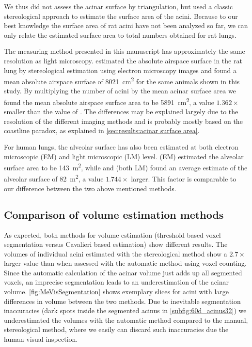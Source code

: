 \documentclass[paper=a4,DIV=calc,abstract,english]{scrartcl}
\newcommand{\difference}{2.7\xspace} %
\newcommand{\meanairspacesurface}{5891} %
\newcommand{\airspacedifference}{1.362\xspace} %
\begin{document}
We thus did not assess the acinar surface by triangulation, but used a classic stereological approach to estimate the surface area of the acini.
Because to our best knowledge the surface area of rat acini have not been analyzed so far, we can only relate the estimated surface area to total numbers obtained for rat lungs.

The measuring method presented in this manuscript has approximately the same resolution as light microscopy.
\citet{Tschanz2003} estimated the absolute airspace surface in the rat lung by stereological estimation using electron microscopy images and found a mean absolute airspace surface of \SI{8021}{\centi\meter\squared} for the same animals shown in this study.
By multiplying the number of acini by the mean acinar surface area we found the mean absolute airspace surface area to be \SI{\meanairspacesurface}{\centi\meter\squared}, a value \(\airspacedifference\times\) smaller than the value of \citeauthor{Tschanz2003}.
The differences may be explained largely due to the resolution of the different imaging methods and is probably mostly based on the coastline paradox, as explained in \autoref{sec:results:acinar surface area}.

For human lungs, the alveolar surface has also been estimated at both electron microscopic (EM) and light microscopic (LM) level.
\citet{Gehr1978} (EM) estimated the alveolar surface area to be \SI{143}{\square\meter}, while \citet{Weibel1963} and \citet{Thurlbeck1967} (both LM) found an average estimate of the alveolar surface of \SI{82}{\square\meter}, a value \(1.744\times\) larger.
This factor is comparable to our difference between the two above mentioned methods.

\subsection{Comparison of volume estimation methods}
As expected, both methods for volume estimation (threshold based voxel segmentation versus Cavalieri based estimation) show different results.
The volumes of individual acini estimated with the stereological method show a \(\difference\times\) larger value than when assessed with the automatic method using voxel counting.
Since the automatic calculation of the acinar volume just adds up all segmented voxels, an imprecise segmentation leads to an underestimation of the acinar volume.
\autoref{fig:MeVisSegmentation} shows exemplary slices for acini with large differences in volume between the two methods.
Due to inevitable segmentation inaccuracies (dark spots inside the segmented acinus in \autoref{subfig:60d_acinus32}) we underestimated the volumes with the automatic method compared to the manual, stereological method, where we easily can discard such inaccuracies due the human visual inspection.
\end{document}
